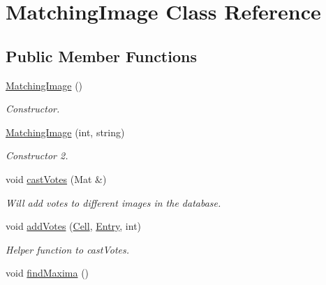 \hypertarget{classMatchingImage}{\section{\-Matching\-Image \-Class \-Reference}
\label{classMatchingImage}
}
\subsection*{\-Public \-Member \-Functions}
\begin{DoxyCompactItemize}
\item 
\hypertarget{classMatchingImage_af047e292090610e8343d5599d2bf23a2}{\hyperlink{classMatchingImage_af047e292090610e8343d5599d2bf23a2}{\-Matching\-Image} ()}\label{classMatchingImage_af047e292090610e8343d5599d2bf23a2}

\begin{DoxyCompactList}\small\item\em \-Constructor. \end{DoxyCompactList}\item 
\hypertarget{classMatchingImage_a56099f7ece98c96062e16fe24fdcfe85}{\hyperlink{classMatchingImage_a56099f7ece98c96062e16fe24fdcfe85}{\-Matching\-Image} (int, string)}\label{classMatchingImage_a56099f7ece98c96062e16fe24fdcfe85}

\begin{DoxyCompactList}\small\item\em \-Constructor 2. \end{DoxyCompactList}\item 
void \hyperlink{classMatchingImage_a9b37df20ee22da8f0fc5b6dce1fc452e}{cast\-Votes} (\-Mat \&)
\begin{DoxyCompactList}\small\item\em \-Will add votes to different images in the database. \end{DoxyCompactList}\item 
void \hyperlink{classMatchingImage_aad29ba5d24382051784e5a19edcad69d}{add\-Votes} (\hyperlink{classCell}{\-Cell}, \hyperlink{classEntry}{\-Entry}, int)
\begin{DoxyCompactList}\small\item\em \-Helper function to cast\-Votes. \end{DoxyCompactList}\item 
\hypertarget{classMatchingImage_ad32e697a01f3a18103192918f856dfd6}{void \hyperlink{classMatchingImage_ad32e697a01f3a18103192918f856dfd6}{find\-Maxima} ()}\label{classMatchingImage_ad32e697a01f3a18103192918f856dfd6}


\end{DoxyCompactItemize}
